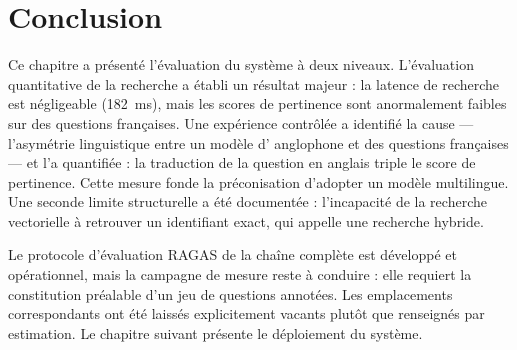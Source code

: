 \section{Conclusion}

Ce chapitre a présenté l'évaluation du système à deux niveaux. L'évaluation
quantitative de la recherche a établi un résultat majeur : la latence de
recherche est négligeable (182~ms), mais les scores de pertinence sont
anormalement faibles sur des questions françaises. Une expérience contrôlée a
identifié la cause --- l'asymétrie linguistique entre un modèle
d' anglophone et des questions françaises --- et l'a quantifiée :
la traduction de la question en anglais triple le score de pertinence. Cette
mesure fonde la préconisation d'adopter un modèle multilingue. Une seconde limite
structurelle a été documentée : l'incapacité de la recherche vectorielle à
retrouver un identifiant exact, qui appelle une recherche hybride.

Le protocole d'évaluation RAGAS de la chaîne complète est développé et
opérationnel, mais la campagne de mesure reste à conduire : elle requiert la
constitution préalable d'un jeu de questions annotées. Les emplacements
correspondants ont été laissés explicitement vacants plutôt que renseignés par
estimation. Le chapitre suivant présente le déploiement du système.

